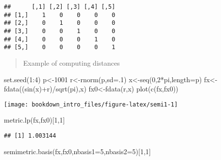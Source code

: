 \documentclass[
]{book}
\newenvironment{Shaded}{\begin{snugshade}}{\end{snugshade}}
\newcommand{\AttributeTok}[1]{\textcolor[rgb]{0.77,0.63,0.00}{#1}}
\newcommand{\DecValTok}[1]{\textcolor[rgb]{0.00,0.00,0.81}{#1}}
\newcommand{\FunctionTok}[1]{\textcolor[rgb]{0.00,0.00,0.00}{#1}}
\newcommand{\NormalTok}[1]{#1}
\newcommand{\OtherTok}[1]{\textcolor[rgb]{0.56,0.35,0.01}{#1}}
\newcommand{\SpecialCharTok}[1]{\textcolor[rgb]{0.00,0.00,0.00}{#1}}
\begin{document}
\begin{verbatim}
##      [,1] [,2] [,3] [,4] [,5]
## [1,]    1    0    0    0    0
## [2,]    0    1    0    0    0
## [3,]    0    0    1    0    0
## [4,]    0    0    0    1    0
## [5,]    0    0    0    0    1
\end{verbatim}

\begin{quote}
Example of computing distances
\end{quote}

\begin{Shaded}
\begin{Highlighting}[]
\FunctionTok{set.seed}\NormalTok{(}\DecValTok{1}\SpecialCharTok{:}\DecValTok{4}\NormalTok{)}
\NormalTok{p}\OtherTok{\textless{}{-}}\DecValTok{1001}
\NormalTok{r}\OtherTok{\textless{}{-}}\FunctionTok{rnorm}\NormalTok{(p,}\AttributeTok{sd=}\NormalTok{.}\DecValTok{1}\NormalTok{)}
\NormalTok{x}\OtherTok{\textless{}{-}}\FunctionTok{seq}\NormalTok{(}\DecValTok{0}\NormalTok{,}\DecValTok{2}\SpecialCharTok{*}\NormalTok{pi,}\AttributeTok{length=}\NormalTok{p)}
\NormalTok{fx}\OtherTok{\textless{}{-}}\FunctionTok{fdata}\NormalTok{((}\FunctionTok{sin}\NormalTok{(x)}\SpecialCharTok{+}\NormalTok{r)}\SpecialCharTok{/}\FunctionTok{sqrt}\NormalTok{(pi),x)}
\NormalTok{fx0}\OtherTok{\textless{}{-}}\FunctionTok{fdata}\NormalTok{(r,x)}
\FunctionTok{plot}\NormalTok{(}\FunctionTok{c}\NormalTok{(fx,fx0))}
\end{Highlighting}
\end{Shaded}

\begin{center}\texttt{[image: bookdown\_intro\_files/figure-latex/semi1-1]} \end{center}

\begin{Shaded}
\begin{Highlighting}[]
\FunctionTok{metric.lp}\NormalTok{(fx,fx0)[}\DecValTok{1}\NormalTok{,}\DecValTok{1}\NormalTok{]}
\end{Highlighting}
\end{Shaded}

\begin{verbatim}
## [1] 1.003144
\end{verbatim}

\begin{Shaded}
\begin{Highlighting}[]
\FunctionTok{semimetric.basis}\NormalTok{(fx,fx0,}\AttributeTok{nbasis1=}\DecValTok{5}\NormalTok{,}\AttributeTok{nbasis2=}\DecValTok{5}\NormalTok{)[}\DecValTok{1}\NormalTok{,}\DecValTok{1}\NormalTok{]}
\end{Highlighting}
\end{Shaded}
\end{document}
